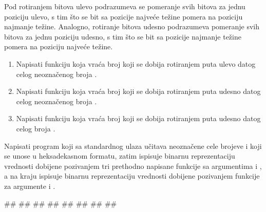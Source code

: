 \begin{Exercise}[label=1_09] %
Pod rotiranjem bitova ulevo podrazumeva se pomeranje svih bitova za jednu poziciju ulevo, s tim što se bit sa pozicije najveće težine pomera na poziciju najmanje težine. Analogno, rotiranje bitova udesno podrazumeva pomeranje svih bitova za jednu poziciju udesno, s tim što se bit sa pozicije najmanje težine pomera na poziciju najveće težine.
\begin{enumerate}
\item Napisati funkciju  koja vraća broj koji se dobija rotiranjem  puta ulevo datog celog neoznačenog broja . 
\item Napisati funkciju  koja vraća broj koji se dobija rotiranjem  puta udesno datog celog neoznačenog broja . 
\item Napisati funkciju  koja vraća broj koji se dobija rotiranjem  puta udesno datog celog broja . 
\end{enumerate}
Napisati program koji sa standardnog ulaza učitava neoznačene cele brojeve  i  koji se unose u heksadekasnom formatu, zatim ispisuje binarnu reprezentaciju vrednosti dobijene pozivanjem tri prethodno napisane funkcije sa argumentima   i , a na kraju ispisuje binarnu reprezentaciju vrednosti dobijene pozivanjem funkcije  za argumente  i .

\begin{maxitest}
\begin{upotreba}{1}
#\naslovInt#
##
##
##
##
##
##
##
\end{upotreba}
\end{maxitest}


\end{Exercise}
